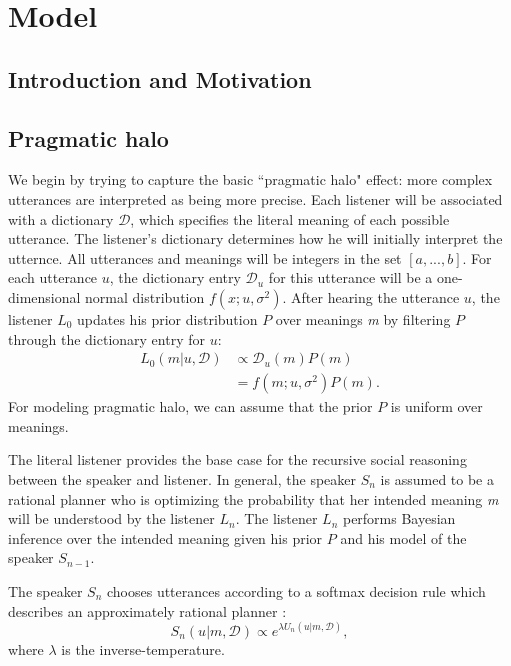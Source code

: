 \documentclass{article} %
\newcommand{\dictionary}{\ensuremath{\mathcal{D}}\xspace}
\begin{document}

\section{Model}

\subsection{Introduction and Motivation}
\subsection{Pragmatic halo}

We begin by trying to capture the basic ``pragmatic halo" effect: more complex utterances are interpreted as being more precise. Each listener will be associated with a dictionary $\dictionary$, which specifies the literal meaning of each possible utterance. The listener's dictionary determines how he will initially interpret the utternce. All utterances and meanings will be integers in the set $[a,...,b]$. For each utterance $u$, the dictionary entry $\dictionary_u$ for this utterance will be a one-dimensional normal distribution $f(x;u,\sigma^2)$. After hearing the utterance $u$, the listener $L_0$ updates his prior distribution $P$ over meanings \emph{m} by filtering $P$ through the dictionary entry for $u$:
\begin{align}\label{eq:literallistener}
L_0(m | u, \dictionary) &\propto \dictionary_u(m)P(m) \\
&=f(m;u,\sigma^2)P(m).
\end{align}
For modeling pragmatic halo, we can assume that the prior $P$ is uniform over meanings.

The literal listener provides the base case for the recursive social reasoning between the speaker and listener. In general, the speaker $S_n$ is assumed to be a rational planner who is optimizing the probability that her intended meaning \emph{m} will be understood by the listener $L_n$. The listener $L_n$ performs Bayesian inference over the intended meaning given his prior $P$ and his model of the speaker $S_{n-1}$.

The speaker $S_n$ chooses utterances according to a softmax decision rule which describes an approximately rational planner \cite{sutton1998reinforcement}:
\begin{equation}\label{eq:speakerprob}
S_n(u | m,\dictionary) \propto e^{\lambda U_n(u | m,\dictionary)},
\end{equation}
where $\lambda$ is the inverse-temperature. 
\end{document}
